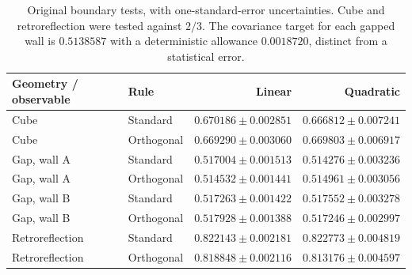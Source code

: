 \begin{table}[htbp]\centering\small\caption{Original boundary tests, with one-standard-error uncertainties. Cube and retroreflection were tested against $2/3$. The covariance target for each gapped wall is $0.5138587$ with a deterministic allowance $0.0018720$, distinct from a statistical error.}
\begin{tabular}{llrr}\toprule
Geometry / observable & Rule & Linear & Quadratic\\\midrule
Cube & Standard & $0.670186\pm0.002851$ & $0.666812\pm0.007241$\\
Cube & Orthogonal & $0.669290\pm0.003060$ & $0.669803\pm0.006917$\\
Gap, wall A & Standard & $0.517004\pm0.001513$ & $0.514276\pm0.003236$\\
Gap, wall A & Orthogonal & $0.514532\pm0.001441$ & $0.514961\pm0.003056$\\
Gap, wall B & Standard & $0.517263\pm0.001422$ & $0.517552\pm0.003278$\\
Gap, wall B & Orthogonal & $0.517928\pm0.001388$ & $0.517246\pm0.002997$\\
Retroreflection & Standard & $0.822143\pm0.002181$ & $0.822773\pm0.004819$\\
Retroreflection & Orthogonal & $0.818848\pm0.002116$ & $0.813176\pm0.004597$\\
\bottomrule\end{tabular}\end{table}
